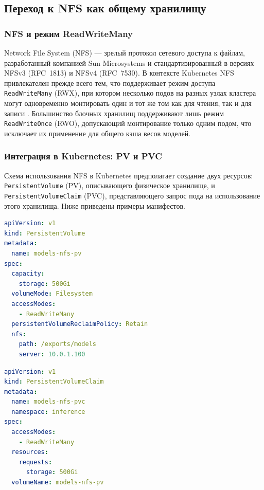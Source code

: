 \subsection{Переход к NFS как общему хранилищу}

\subsubsection{NFS и режим ReadWriteMany}

Network File System (NFS) --- зрелый протокол сетевого доступа к файлам, разработанный компанией Sun Microsystems и стандартизированный в версиях NFSv3 (RFC~1813) и NFSv4 (RFC~7530). В контексте Kubernetes NFS привлекателен прежде всего тем, что поддерживает режим доступа \texttt{ReadWriteMany} (RWX), при котором несколько подов на разных узлах кластера могут одновременно монтировать один и тот же том как для чтения, так и для записи \cite{nfs_k8s_docs}. Большинство блочных хранилищ поддерживают лишь режим \texttt{ReadWriteOnce} (RWO), допускающий монтирование только одним подом, что исключает их применение для общего кэша весов моделей.

\subsubsection{Интеграция в Kubernetes: PV и PVC}

Схема использования NFS в Kubernetes предполагает создание двух ресурсов: \texttt{PersistentVolume} (PV), описывающего физическое хранилище, и \texttt{PersistentVolumeClaim} (PVC), представляющего запрос пода на использование этого хранилища. Ниже приведены примеры манифестов.

\begin{lstlisting}[language=yaml, caption={PersistentVolume на базе NFS}]
apiVersion: v1
kind: PersistentVolume
metadata:
  name: models-nfs-pv
spec:
  capacity:
    storage: 500Gi
  volumeMode: Filesystem
  accessModes:
    - ReadWriteMany
  persistentVolumeReclaimPolicy: Retain
  nfs:
    path: /exports/models
    server: 10.0.1.100
\end{lstlisting}

\begin{lstlisting}[language=yaml, caption={PersistentVolumeClaim для NFS-тома}]
apiVersion: v1
kind: PersistentVolumeClaim
metadata:
  name: models-nfs-pvc
  namespace: inference
spec:
  accessModes:
    - ReadWriteMany
  resources:
    requests:
      storage: 500Gi
  volumeName: models-nfs-pv
\end{lstlisting}

